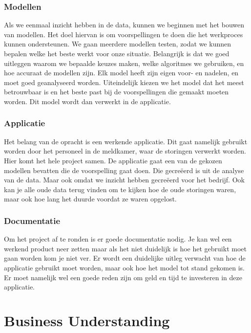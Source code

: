 \documentclass{article}
\begin{document}
\subsubsection{Modellen}
Als we eenmaal inzicht hebben in de data, kunnen we beginnen met het bouwen van modellen. Het doel hiervan is om voorspellingen te doen die het werkproces kunnen ondersteunen. We gaan meerdere modellen testen, zodat we kunnen bepalen welke het beste werkt voor onze situatie. Belangrijk is dat we goed uitleggen waarom we bepaalde keuzes maken, welke algoritmes we gebruiken, en hoe accuraat de modellen zijn. Elk model heeft zijn eigen voor- en nadelen, en moet goed geanalyseerd worden. Uiteindelijk kiezen we het model dat het meest betrouwbaar is en het beste past bij de voorspellingen die gemaakt moeten worden. Dit model wordt dan verwerkt in de applicatie.
 
\subsubsection{Applicatie}
Het belang van de opracht is een werkende applicatie. Dit gaat namelijk gebruikt worden door het personeel in de meldkamer, waar de storingen verwerkt worden. Hier komt het hele project samen. De applicatie gaat een van de gekozen modellen bevatten die de voorspelling gaat doen. Die gecreëerd is uit de analyse van de data. Maar ook omdat we inzicht hebben gecreëerd voor het bedrijf. Ook kan je alle oude data terug vinden om te kijken hoe de oude storingen waren, maar ook hoe lang het duurde voordat ze waren opgelost.

\subsubsection{Documentatie}
Om het project af te ronden is er goede documentatie nodig. Je kan wel een werkend product neer zetten maar als het niet duidelijk is hoe het gebruikt moet gaan worden kom je niet ver. Er wordt een duidelijke uitleg verwacht van hoe de applicatie gebruikt moet worden, maar ook hoe het model tot stand gekomen is. Er moet namelijk wel een goede reden zijn om geld en tijd te investeren in deze applicatie.
 
\newpage
\section{Business Understanding}
\end{document}
